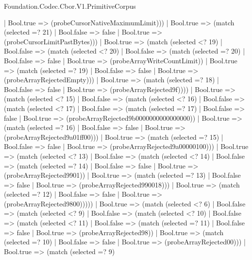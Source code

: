\begin{lexlean}{Foundation.Codec.Cbor.V1.PrimitiveCorpus}
\begin{semanticmodule}
{                    | Bool.true => (probeCursorNativeMaximumLimit)))
                | Bool.true => (match (selected =? 21)
                  | Bool.false => false
                  | Bool.true => (probeCursorLimitPastBytes)))
              | Bool.true => (match (selected <? 19)
                | Bool.false => (match (selected <? 20)
                  | Bool.false => (match (selected =? 20)
                    | Bool.false => false
                    | Bool.true => (probeArrayWriteCountLimit))
                  | Bool.true => (match (selected =? 19)
                    | Bool.false => false
                    | Bool.true => (probeArrayRejectedEmpty)))
                | Bool.true => (match (selected =? 18)
                  | Bool.false => false
                  | Bool.true => (probeArrayRejected9f))))
            | Bool.true => (match (selected <? 15)
              | Bool.false => (match (selected <? 16)
                | Bool.false => (match (selected <? 17)
                  | Bool.false => (match (selected =? 17)
                    | Bool.false => false
                    | Bool.true => (probeArrayRejected9b0000000000000000))
                  | Bool.true => (match (selected =? 16)
                    | Bool.false => false
                    | Bool.true => (probeArrayRejected9a01ff00)))
                | Bool.true => (match (selected =? 15)
                  | Bool.false => false
                  | Bool.true => (probeArrayRejected9a00000100)))
              | Bool.true => (match (selected <? 13)
                | Bool.false => (match (selected <? 14)
                  | Bool.false => (match (selected =? 14)
                    | Bool.false => false
                    | Bool.true => (probeArrayRejected9901))
                  | Bool.true => (match (selected =? 13)
                    | Bool.false => false
                    | Bool.true => (probeArrayRejected990018)))
                | Bool.true => (match (selected =? 12)
                  | Bool.false => false
                  | Bool.true => (probeArrayRejected9800)))))
          | Bool.true => (match (selected <? 6)
            | Bool.false => (match (selected <? 9)
              | Bool.false => (match (selected <? 10)
                | Bool.false => (match (selected <? 11)
                  | Bool.false => (match (selected =? 11)
                    | Bool.false => false
                    | Bool.true => (probeArrayRejected98))
                  | Bool.true => (match (selected =? 10)
                    | Bool.false => false
                    | Bool.true => (probeArrayRejected00)))
                | Bool.true => (match (selected =? 9)
}
\end{semanticmodule}
\end{lexlean}
